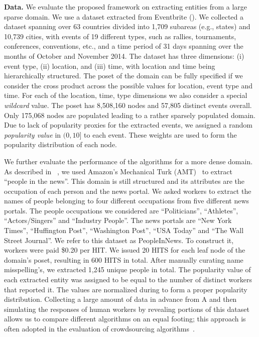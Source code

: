 \noindent\textbf{Data.} We evaluate the proposed framework on extracting entities from a large sparse domain. We use a dataset extracted from Eventbrite (). We collected a dataset spanning over 63 countries divided into 1,709 subareas (e.g., states) and 10,739 cities, with events of 19 different types, such as rallies, tournaments, conferences, conventions, etc., and a time period of 31 days spanning over the months of October and November 2014. The dataset has three dimensions: (i) event type, (ii) location, and (iii) time, with location and time being hierarchically structured. The poset of the domain can be fully specified if we consider the cross product across the possible values for location, event type and time. For each of the location, time, type dimensions we also consider a special {\em wildcard} value. The poset has 8,508,160 nodes and 57,805 distinct events overall. Only 175,068 nodes are populated leading to a rather sparsely populated domain. Due to lack of popularity proxies for the extracted events, we assigned a random {\em popularity value} in $(0,10]$ to each event. These weights are used to form the popularity distribution of each node. 

We further evaluate the performance of the algorithms for a more dense domain. As described in ~, we used Amazon's Mechanical Turk (AMT)~\cite{mturk} to extract ``people in the news''. This domain is still structured and its attributes are the occupation of each person and the news portal. We asked workers to extract the names of people belonging to four different occupations from five different news portals. The people occupations we considered are ``Politicians'', ``Athletes'', ``Actors/Singers'' and ``Industry People''. The news portals are ``New York Times'', ``Huffington Post'', ``Washington Post'', ``USA  Today'' and ``The Wall Street Journal''. We refer to this dataset as PeopleInNews. To construct it, workers were paid \$0.20 per HIT. We issued 20 HITS for each leaf node of the domain's poset, resulting in 600 HITS in total. After manually curating name misspelling's, we extracted 1,245 unique people in total. The popularity value of each extracted entity was assigned to be equal to the number of distinct workers that reported it. The values are normalized during to form a proper popularity distribution. Collecting a large amount of data in advance from A and then simulating the responses of human workers by revealing portions of this dataset allows us to compare different algorithms on an equal footing; this approach is often adopted in the evaluation of crowdsourcing algorithms~\cite{DBLP:journals/pvldb/ParameswaranBG0PW14, marcus:2011,trushkowsky:2013}.

